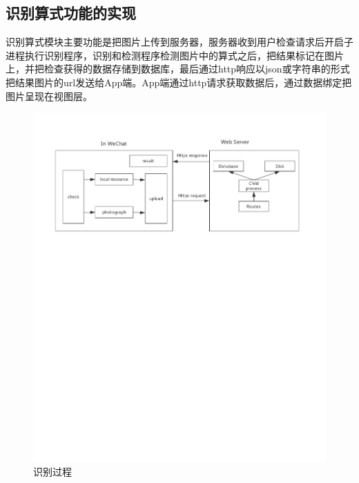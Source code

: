 \subsection{识别算式功能的实现}
识别算式模块主要功能是把图片上传到服务器，服务器收到用户检查请求后开启子进程执行识别程序，识别和检测程序检测图片中的算式之后，把结果标记在图片上，并把检查获得的数据存储到数据库，最后通过http响应以json或字符串的形式把结果图片的url发送给App端。App端通过http请求获取数据后，通过数据绑定把图片呈现在视图层。
\begin{figure}[h!]
	\centering
	\includegraphics[width=350bp]{picture/identify.pdf}
	\caption{识别过程}
	\label{fig:}
\end{figure}
\par

